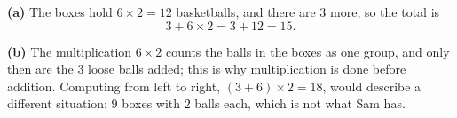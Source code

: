 \textbf{(a)} The boxes hold $6\times2=12$ basketballs, and there are $3$ more, so the total is
\[3+6\times2=3+12=\boxed{15}.\]

\textbf{(b)} The multiplication $6\times2$ counts the balls in the boxes as one group, and only then are the $3$ loose balls added; this is why multiplication is done before addition. Computing from left to right, $(3+6)\times2=18$, would describe a different situation: $9$ boxes with $2$ balls each, which is not what Sam has.
